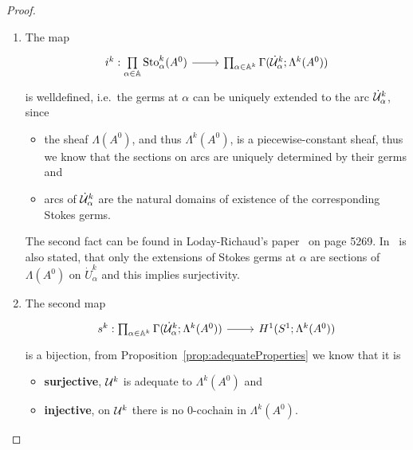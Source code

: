 \begin{proof}
  \begin{enumerate}
  \item The map
    \[ \begin{tikzcd}
      i^k: \underset{\alpha\in\A}\prod\Sto_\alpha^k(A^0)
      \rar &
            \prod_{\alpha\in\A^k}\Gamma(\dot\cU_\alpha^k;\Lambda^k(A^0))
    \end{tikzcd} \]
    is welldefined, i.e.\ the germs at $\alpha$ can be uniquely
    extended to the arc $\dot{\mathcal{U}}_\alpha^k$, since
    \begin{itemize}
    \item the sheaf $\Lambda(A^0)$, and thus $\Lambda^k(A^0)$, is a
      piecewise-constant sheaf, thus we know that the sections on arcs are
      uniquely determined by their germs and
    \item arcs of $\dot{\mathcal{U}}_\alpha^k$ are the natural domains of existence of the
      corresponding Stokes germs.
    \end{itemize}
    The second fact can be found in Loday-Richaud's paper~\cite{Loday2004} on
    page 5269.
    In~\cite[5269]{Loday2004} is also stated, that only the extensions of Stokes
    germs at $\alpha$ are sections of $\Lambda(A^0)$ on $\dot U_\alpha^k$ and
    this implies surjectivity.
  \item The second map
    \[ \begin{tikzcd}
      s^k:
            \prod_{\alpha\in\A^k}\Gamma(\dot\cU_\alpha^k;\Lambda^k(A^0))
      \rar &
      H^1(S^1;\Lambda^k(A^0))
    \end{tikzcd} \]
    is a bijection,  from
    Proposition~\ref{prop:adequateProperties} we know that it is
    \begin{itemize}
    \item \textbf{surjective},  $\mathcal{U}^k$ is adequate to
      $\Lambda^k(A^0)$ and
    \item \textbf{injective},  on $\mathcal{U}^k$ there is no
      $0$-cochain in $\Lambda^k(A^0)$.
    \end{itemize}
  \end{enumerate}
  \PROBLEM[Naturality?]
\end{proof}

